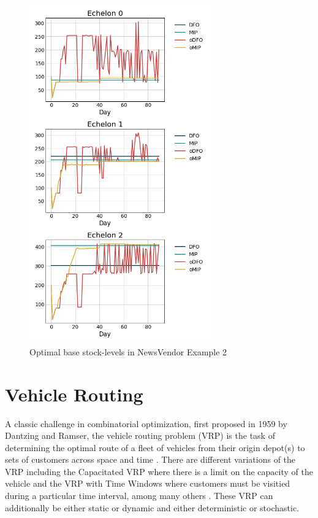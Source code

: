 \documentclass[12pt]{article}
\begin{document}
\begin{figure}[!htbp]
    \centering
    \includegraphics[width=0.7\textwidth]{NewsVendor_LostSales_zopt.png}
    \caption{Optimal base stock-levels in NewsVendor Example 2}
    \label{fig:NV_LostSales_basestock}
\end{figure}

\section{Vehicle Routing}

A classic challenge in combinatorial optimization, first proposed in 1959 by Dantzing and Ramser, the vehicle routing problem (VRP) is the task of determining the optimal route of a fleet of vehicles from their origin depot(s) to sets of customers across space and time \cite{Dantzig1959}. 
There are different variations of the VRP including the Capacitated VRP where there is a limit on the capacity of the vehicle and the VRP with Time Windows where customers must be visitied during a particular time interval, among many others \citep{PIllac2013}. 
These VRP can additionally be either static or dynamic and either deterministic or stochastic. 
\end{document}
